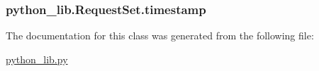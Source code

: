 \hypertarget{classpython__lib_1_1_request_set_a7a93e544e11b330069fe9d5fc7ccdef3}{
\subsubsection[{timestamp}]{\setlength{\rightskip}{0pt plus 5cm}python\-\_\-lib.\-Request\-Set.\-timestamp}}\label{classpython__lib_1_1_request_set_a7a93e544e11b330069fe9d5fc7ccdef3}


The documentation for this class was generated from the following file\-:\begin{DoxyCompactItemize}
\item 
\hyperlink{python__lib_8py}{python\-\_\-lib.\-py}\end{DoxyCompactItemize}
